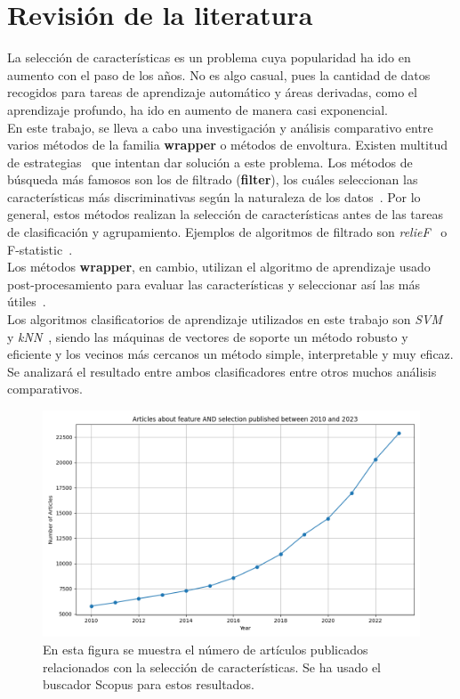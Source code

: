 \chapter{Revisión de la literatura}
La selección de características es un problema cuya popularidad ha ido en aumento con el paso de los años. No es algo casual, pues la cantidad de datos recogidos para tareas de aprendizaje automático y áreas derivadas, como el aprendizaje profundo, ha ido en aumento de manera casi exponencial.\\[6pt]
En este trabajo, se lleva a cabo una investigación y análisis comparativo entre varios métodos
de la familia \textbf{wrapper} o métodos de envoltura. Existen multitud de estrategias~\cite{miao_survey_2016}
que intentan dar solución a este problema. Los métodos de búsqueda más famosos son los de filtrado
(\textbf{filter}), los cuáles seleccionan las características más discriminativas según la naturaleza de los datos~\cite{miao_survey_2016}.
Por lo general, estos métodos realizan la selección de características antes de las tareas de clasificación y
agrupamiento. Ejemplos de algoritmos de filtrado son \textit{relieF}~\cite{kira_practical_1992} o F-statistic~\cite{ding_minimum_2005}.\\[6pt]
Los métodos \textbf{wrapper}, en cambio, utilizan el algoritmo de aprendizaje usado post-procesamiento
para evaluar las características y seleccionar así las más útiles~\cite{miao_survey_2016}.\\[6pt]
Los algoritmos clasificatorios de aprendizaje utilizados en este trabajo son \textit{SVM}~\cite{cortes_support-vector_1995}
y \textit{kNN}~\cite{fix_discriminatory_1989,cover_nearest_1967}, siendo las máquinas de vectores de
soporte un método robusto y eficiente y los vecinos más cercanos un método simple, interpretable
y muy eficaz. Se analizará el resultado entre ambos clasificadores entre otros muchos análisis comparativos.

\begin{figure}[htp]
  \begin{center}
    \includegraphics[width=1\textwidth]{imagenes/scopus_chart.png}
  \end{center}
  \caption[Popularidad de feature selection sobre los años]{En esta figura se muestra el número de artículos publicados relacionados con la selección de características. Se ha usado el buscador Scopus para estos resultados.}
  \label{fig:pop_fs}
\end{figure}

